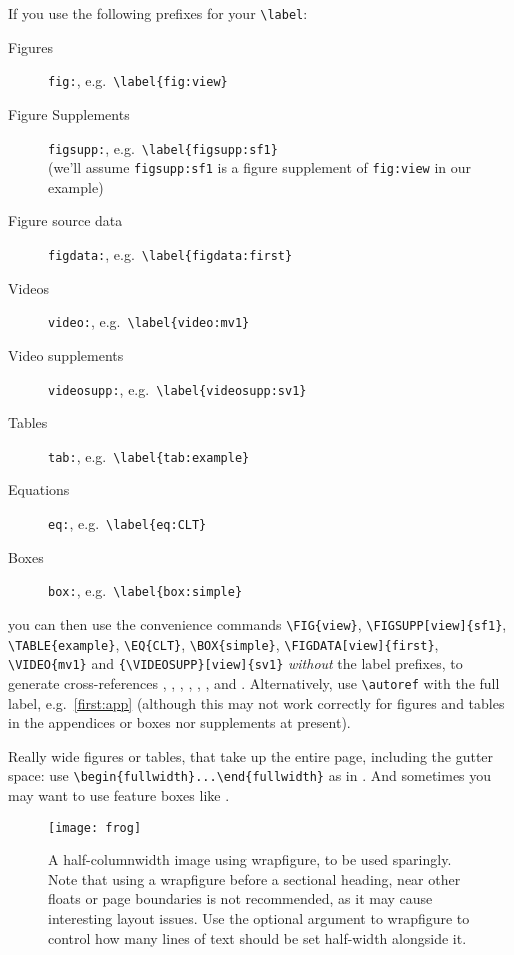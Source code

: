 If you use the following prefixes for your \verb|\label|:
%
\begin{description}
\item[Figures] \texttt{fig:}, e.g.~\verb|\label{fig:view}|
\item[Figure Supplements] \texttt{figsupp:}, e.g.~\verb|\label{figsupp:sf1}|\\
(we'll assume \texttt{figsupp:sf1} is a figure supplement of \texttt{fig:view} in our example)
\item[Figure source data] \texttt{figdata:}, e.g.~\verb|\label{figdata:first}|
\item[Videos] \texttt{video:}, e.g.~\verb|\label{video:mv1}|
\item[Video supplements] \texttt{videosupp:}, e.g.~\verb|\label{videosupp:sv1}|
\item[Tables] \texttt{tab:}, e.g.~\verb|\label{tab:example}|
\item[Equations] \texttt{eq:}, e.g.~\verb|\label{eq:CLT}|
\item[Boxes] \texttt{box:}, e.g.~\verb|\label{box:simple}|
\end{description}
%
you can then use the convenience commands \verb|\FIG{view}|, \verb|\FIGSUPP[view]{sf1}|, \verb|\TABLE{example}|, \verb|\EQ{CLT}|, \verb|\BOX{simple}|, \verb|\FIGDATA[view]{first}|, \verb|\VIDEO{mv1}| and \verb|{\VIDEOSUPP}[view]{sv1}| \emph{without} the label prefixes, to generate cross-references , ,  , , , ,  and . Alternatively, use \verb|\autoref| with the full label, e.g.~\autoref{first:app} (although this may not work correctly for figures and tables in the appendices or boxes nor supplements at present).

Really wide figures or tables, that take up the entire page, including the gutter space: use \verb|\begin{fullwidth}...\end{fullwidth}| as in . And sometimes you may want to use feature boxes like .

\begin{wrapfigure}{l}{.46\textwidth}
\texttt{[image: frog]}
\caption{A half-columnwidth image using wrapfigure, to be used sparingly. Note that using a wrapfigure before a sectional heading, near other floats or page boundaries is not recommended, as it may cause interesting layout issues. Use the optional argument to wrapfigure to control how many lines of text should be set half-width alongside it.}
\label{fig:halfwidth}
\end{wrapfigure}

